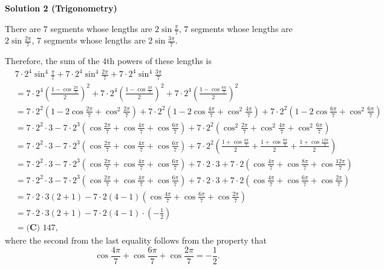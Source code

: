 \begin{enumerate}
 



\textbf{Solution 2 (Trigonometry)}

There are $7$ segments whose lengths are $2 \sin \frac{\pi}{7}$, $7$ segments whose lengths are $2 \sin \frac{2 \pi}{7}$, $7$ segments whose lengths are $2 \sin \frac{3\pi}{7}$.

 Therefore, the sum of the $4$th powers of these lengths is
 \begin{align*} & 7 \cdot 2^4 \sin^4 \frac{\pi}{7} + 7 \cdot 2^4 \sin^4 \frac{2 \pi}{7} + 7 \cdot 2^4 \sin^4 \frac{3 \pi}{7} \\ & = 7 \cdot 2^4 \left( \frac{1 - \cos \frac{2 \pi}{7}}{2} \right)^2 + 7 \cdot 2^4 \left( \frac{1 - \cos \frac{4 \pi}{7}}{2} \right)^2 + 7 \cdot 2^4 \left( \frac{1 - \cos \frac{6 \pi}{7}}{2} \right)^2 \\ & = 7 \cdot 2^2 \left( 1 - 2 \cos \frac{2 \pi}{7} + \cos^2 \frac{2 \pi}{7} \right) + 7 \cdot 2^2 \left( 1 - 2 \cos \frac{4 \pi}{7} + \cos^2 \frac{4 \pi}{7} \right) + 7 \cdot 2^2 \left( 1 - 2 \cos \frac{6 \pi}{7} + \cos^2 \frac{6 \pi}{7} \right) \\ & = 7 \cdot 2^2 \cdot 3 - 7 \cdot 2^3 \left( \cos \frac{2 \pi}{7} + \cos \frac{4 \pi}{7} + \cos \frac{6 \pi}{7} \right) + 7 \cdot 2^2 \left( \cos^2 \frac{2 \pi}{7} + \cos^2 \frac{4 \pi}{7}  + \cos^2 \frac{6 \pi}{7} \right) \\ & = 7 \cdot 2^2 \cdot 3 - 7 \cdot 2^3 \left( \cos \frac{2 \pi}{7} + \cos \frac{4 \pi}{7} + \cos \frac{6 \pi}{7} \right) + 7 \cdot 2^2 \left( \frac{1 + \cos \frac{4 \pi}{7} }{2} + \frac{1 + \cos \frac{8 \pi}{7} }{2} + \frac{1 + \cos \frac{12 \pi}{7} }{2} \right) \\ & = 7 \cdot 2^2 \cdot 3 - 7 \cdot 2^3 \left( \cos \frac{2 \pi}{7} + \cos \frac{4 \pi}{7} + \cos \frac{6 \pi}{7} \right) + 7 \cdot 2 \cdot 3 + 7 \cdot 2 \left( \cos \frac{4 \pi}{7} + \cos \frac{8 \pi}{7} + \cos \frac{12 \pi}{7} \right) \\ & = 7 \cdot 2^2 \cdot 3 - 7 \cdot 2^3 \left( \cos \frac{2 \pi}{7} + \cos \frac{4 \pi}{7} + \cos \frac{6 \pi}{7} \right) + 7 \cdot 2 \cdot 3 + 7 \cdot 2 \left( \cos \frac{4 \pi}{7} + \cos \frac{6 \pi}{7} + \cos \frac{2 \pi}{7} \right) \\ & = 7 \cdot 2 \cdot 3 \left( 2 + 1 \right) - 7 \cdot 2 \left( 4 - 1 \right) \left( \cos \frac{4 \pi}{7} + \cos \frac{6 \pi}{7} + \cos \frac{2 \pi}{7} \right) \\ & = 7 \cdot 2 \cdot 3 \left( 2 + 1 \right) - 7 \cdot 2 \left( 4 - 1 \right) \cdot \left( - \frac{1}{2} \right) \\ & = \boxed{\textbf{(C) }147}, \end{align*}
where the second from the last equality follows from the property that
 \[ \cos \frac{4 \pi}{7} + \cos \frac{6 \pi}{7} + \cos \frac{2 \pi}{7} = - \frac{1}{2} . \]


\end{enumerate}
